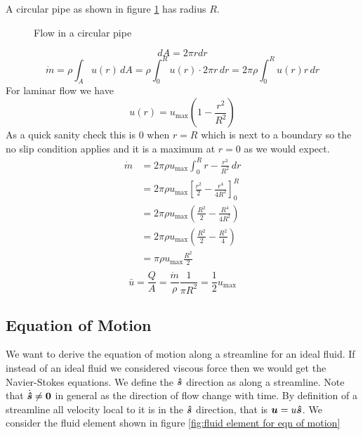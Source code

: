 \documentclass{article}
\begin{document}
    \example
    A circular pipe as shown in figure \ref{fig:flow in circular pipe} has radius \(R\).
    \begin{figure}[ht]
        \centering
        \caption{Flow in a circular pipe}
        \label{fig:flow in circular pipe}
    \end{figure}
    \[dA = 2\pi rdr\]
    \[\dot m = \rho \int_A u(r)\,dA = \rho \int_0^R u(r)\cdot2\pi r\,dr = 2\pi\rho\int_0^R u(r)r\,dr\]
    For laminar flow we have
    \[u(r) = u_\text{max}\left(1 - \frac{r^2}{R^2}\right)\]
    As a quick sanity check this is 0 when \(r = R\) which is next to a boundary so the no slip condition applies and it is a maximum at \(r = 0\) as we would expect.
    \begin{align*}
        \dot m &= 2\pi\rho u_\text{max}\int_0^R r - \frac{r^3}{R^2}\,dr\\
        &= 2\pi\rho u_\text{max}\left[\frac{r^2}{2} - \frac{r^4}{4R^2}\right]_0^R\\
        &= 2\pi\rho u_\text{max}\left(\frac{R^2}{2} - \frac{R^4}{4R^2}\right)\\
        &= 2\pi\rho u_\text{max}\left(\frac{R^2}{2} - \frac{R^2}{4}\right)\\
        &= \pi\rho u_\text{max}\frac{R^2}{2}\\
    \end{align*}
    \[\bar u = \frac{Q}{A} = \frac{\dot m}{\rho}\frac{1}{\pi R^2} = \frac{1}{2} u_\text{max}\]
    
    \subsection{Equation of Motion}
    We want to derive the equation of motion along a streamline for an ideal fluid.
    If instead of an ideal fluid we considered viscous force then we would get the Navier-Stokes equations.
    We define the \(\bm{\hat{s}}\) direction as along a streamline.
    Note that \(\dot{\bm{\hat{s}}}\ne \bm{0}\) in general as the direction of flow change with time.
    By definition of a streamline all velocity local to it is in the \(\bm{\hat{s}}\) direction, that is \(\bm{u} = u\bm{\hat{s}}\).
    We consider the fluid element shown in figure \ref{fig:fluid element for eqn of motion}
    
\end{document}
